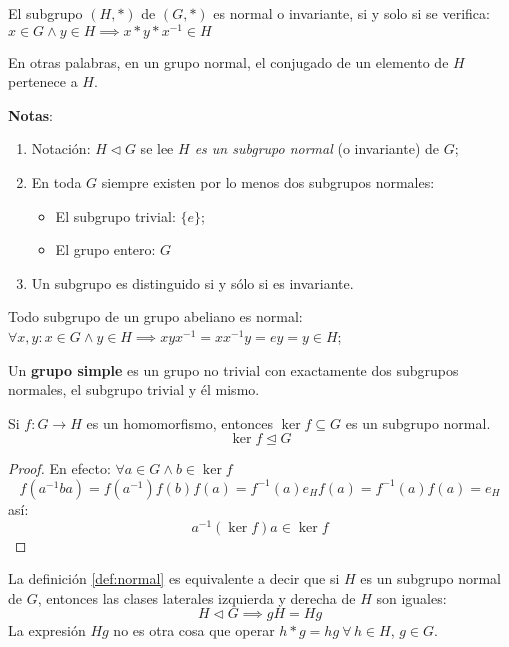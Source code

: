 	\begin{fmd-definition} \label{def:normal}
		El subgrupo $(H, *)$ de $(G, *)$ es normal o invariante, si y solo si se verifica: $ x \in G \land y \in H \implies x * y * x^{-1} \in H $
	\end{fmd-definition}
	
	En otras palabras, en un grupo normal, el conjugado de un elemento de $H$ pertenece a $H$.
	
	\textbf{Notas}:
	\begin{enumerate}
		\item Notación: $H \triangleleft G$ se lee \textit{$H$ es un subgrupo normal} (o invariante) de $G$;
		\item En toda $G$ siempre existen por lo menos dos subgrupos normales:
		\begin{itemize}
			\item El subgrupo trivial: $\{e\}$;
			\item El grupo entero: $G$
		\end{itemize}
		\item Un subgrupo es distinguido si y sólo si es invariante.
	\end{enumerate}
	
	\begin{proposition} \label{prop:subgrupo}
		Todo subgrupo de un grupo abeliano es normal: $\forall x, y: x\in G \land y \in H \implies xyx^{-1} = xx^{-1}y = ey = y \in H$;
	\end{proposition}
	
	\begin{definition}
		Un \textbf{grupo simple} es un grupo no trivial con exactamente dos subgrupos normales, el subgrupo trivial y él mismo.
	\end{definition}
	
	\begin{proposition}
		Si $f: G \rightarrow H$ es un homomorfismo, entonces $\ker f \subseteq G$ es un subgrupo normal. \[ \ker f \trianglelefteq G \]
	\end{proposition}
	
	\begin{proof}
		En efecto: $\forall a \in G \land b \in \ker f$
		\[f(a^{-1}ba) = f(a^{-1}) f(b) f(a) = f^{-1}(a) e_H f(a) = f^{-1}(a)f(a) = e_H\]
		así:
		\[a^{-1} (\ker f) a \in \ker f\]
	\end{proof}
	
	La definición \ref{def:normal} es equivalente a decir que si  $H$ es un subgrupo normal de $G$, entonces las clases laterales izquierda y derecha de $H$ son iguales:
	\begin{equation} \label{eq:normal}
		H \triangleleft G \implies gH = Hg
	\end{equation}
	La expresión $Hg$ no es otra cosa que operar $h * g = hg \ \forall \, h \in H$, $g \in G$.
	
